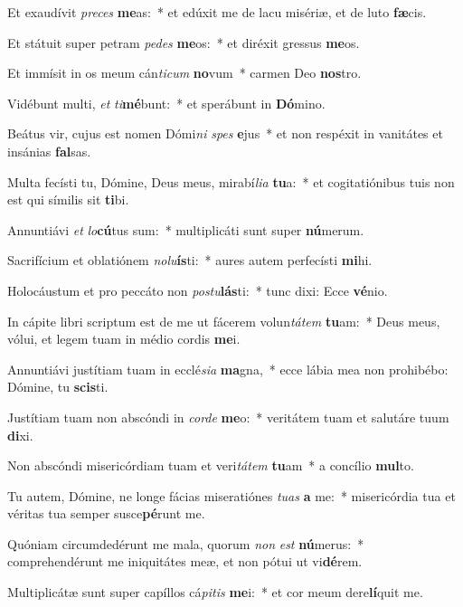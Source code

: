 \item Et exaudívit \textit{pre}\textit{ces} \textbf{me}as:~* et edúxit me de lacu misériæ, et de luto \textbf{fæ}cis.
\item Et státuit super petram \textit{pe}\textit{des} \textbf{me}os:~* et diréxit gressus \textbf{me}os.
\item Et immísit in os meum cán\textit{ti}\textit{cum} \textbf{no}vum~* carmen Deo \textbf{nos}tro.
\item Vidébunt multi, \textit{et} \textit{ti}\textbf{mé}bunt:~* et sperábunt in \textbf{Dó}mino.
\item Beátus vir, cujus est nomen Dómi\textit{ni} \textit{spes} \textbf{e}jus~* et non respéxit in vanitátes et insánias \textbf{fal}sas.
\item Multa fecísti tu, Dómine, Deus meus, mirabí\textit{li}\textit{a} \textbf{tu}a:~* et cogitatiónibus tuis non est qui símilis sit \textbf{ti}bi.
\item Annuntiávi \textit{et} \textit{lo}\textbf{cú}tus sum:~* multiplicáti sunt super \textbf{nú}merum.
\item Sacrifícium et oblatiónem \textit{no}\textit{lu}\textbf{ís}ti:~* aures autem perfecísti \textbf{mi}hi.
\item Holocáustum et pro peccáto non \textit{pos}\textit{tu}\textbf{lás}ti:~* tunc dixi: Ecce \textbf{vé}nio.
\item In cápite libri scriptum est de me ut fácerem volun\textit{tá}\textit{tem} \textbf{tu}am:~* Deus meus, vólui, et legem tuam in médio cordis \textbf{me}i.
\item Annuntiávi justítiam tuam in ecclé\textit{si}\textit{a} \textbf{ma}gna,~* ecce lábia mea non prohibébo: Dómine, tu \textbf{scis}ti.
\item Justítiam tuam non abscóndi in \textit{cor}\textit{de} \textbf{me}o:~* veritátem tuam et salutáre tuum \textbf{di}xi.
\item Non abscóndi misericórdiam tuam et veri\textit{tá}\textit{tem} \textbf{tu}am~* a concílio \textbf{mul}to.
\item Tu autem, Dómine, ne longe fácias miseratiónes \textit{tu}\textit{as} \textbf{a} me:~* misericórdia tua et véritas tua semper susce\textbf{pé}runt me.
\item Quóniam circumdedérunt me mala, quorum \textit{non} \textit{est} \textbf{nú}merus:~* comprehendérunt me iniquitátes meæ, et non pótui ut vi\textbf{dé}rem.
\item Multiplicátæ sunt super capíllos cá\textit{pi}\textit{tis} \textbf{me}i:~* et cor meum dere\textbf{lí}quit me.

